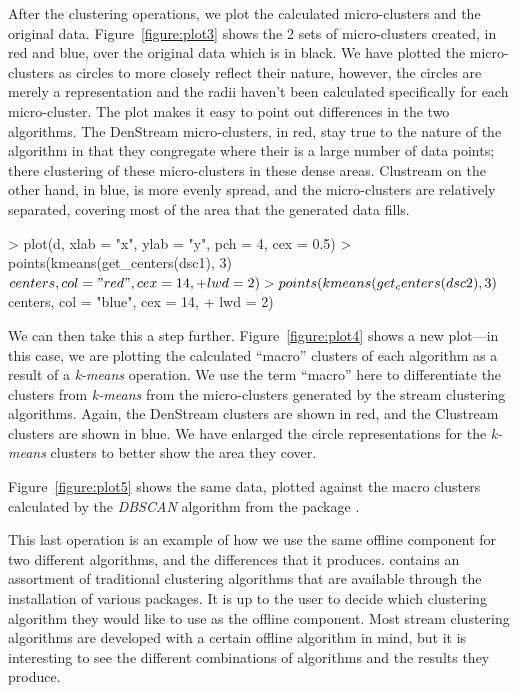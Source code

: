 \documentclass[nojss]{jss}
\begin{document}
After the clustering operations, we plot the calculated micro-clusters and the original data. Figure~\ref{figure:plot3} shows the 2 sets of micro-clusters created, in red and blue, over the original data which is in black. We have plotted the micro-clusters as circles to more closely reflect their nature, however, the circles are merely a representation and the radii haven't been calculated specifically for each micro-cluster. The plot makes it easy to point out differences in the two algorithms. The DenStream micro-clusters, in red, stay true to the nature of the algorithm in that they congregate where their is a large number of data points; there clustering of these micro-clusters in these dense areas. Clustream on the other hand, in blue, is more evenly spread, and the micro-clusters are relatively separated, covering most of the area that the generated data fills.

\begin{Schunk}
\begin{Sinput}
> plot(d, xlab = "x", ylab = "y", pch = 4, cex = 0.5)
> points(kmeans(get_centers(dsc1), 3)$centers, col = "red", cex = 14, 
+     lwd = 2)
> points(kmeans(get_centers(dsc2), 3)$centers, col = "blue", cex = 14, 
+     lwd = 2)
\end{Sinput}
\end{Schunk}

We can then take this a step further. Figure~\ref{figure:plot4} shows a new plot---in this case, we are plotting the calculated ``macro'' clusters of each algorithm as a result of a \textit{k-means} operation. We use the term ``macro'' here to differentiate the clusters from \textit{k-means} from the micro-clusters generated by the stream clustering algorithms. Again, the DenStream clusters are shown in red, and the Clustream clusters are shown in blue. We have enlarged the circle representations for the \textit{k-means} clusters to better show the area they cover.


Figure~\ref{figure:plot5} shows the same data, plotted against the macro clusters calculated by the \textit{DBSCAN} algorithm from the  package \citep{stream:Hennig:2010}.

This last operation is an example of how we use the same offline component for two different algorithms, and the differences that it produces.  contains an assortment of traditional clustering algorithms that are available through the installation of various packages. It is up to the user to decide which clustering algorithm they would like to use as the offline component. Most stream clustering algorithms are developed with a certain offline algorithm in mind, but it is interesting to see the different combinations of algorithms and the results they produce.
\end{document}
